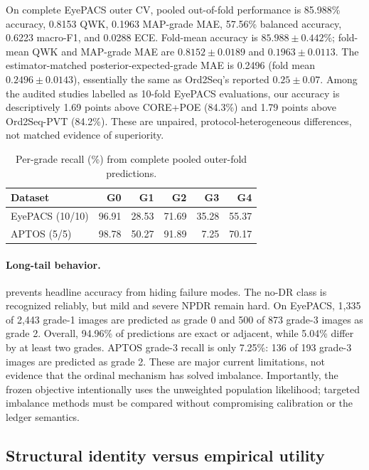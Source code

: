 \documentclass[10pt,twocolumn,letterpaper]{article}
\begin{document}
On complete EyePACS outer CV, pooled out-of-fold performance is 85.988\%
accuracy, 0.8153 QWK, 0.1963 MAP-grade MAE, 57.56\% balanced accuracy,
0.6223 macro-F1, and 0.0288 ECE.  Fold-mean accuracy is
$85.988\!\pm\!0.442$\%; fold-mean QWK and MAP-grade MAE are
$0.8152\!\pm\!0.0189$ and $0.1963\!\pm\!0.0113$.  The estimator-matched
posterior-expected-grade MAE is 0.2496 (fold mean
$0.2496\!\pm\!0.0143$), essentially the same as Ord2Seq's reported
$0.25\!\pm\!0.07$.  Among the audited studies labelled as 10-fold EyePACS
evaluations, our accuracy is descriptively 1.69 points above CORE+POE (84.3\%)
and 1.79 points above Ord2Seq-PVT (84.2\%).  These are unpaired,
protocol-heterogeneous differences, not matched evidence of superiority.

\begin{table}[t]
  \centering
  \caption{Per-grade recall (\%) from complete pooled outer-fold predictions.}
  \label{tab:recall}
  \setlength{\tabcolsep}{4pt}
  \begin{tabular}{@{}lrrrrr@{}}
    \toprule
    Dataset & G0 & G1 & G2 & G3 & G4 \\
    \midrule
    EyePACS (10/10) & 96.91 & 28.53 & 71.69 & 35.28 & 55.37 \\
    APTOS (5/5)    & 98.78 & 50.27 & 91.89 &  7.25 & 70.17 \\
    \bottomrule
  \end{tabular}
\end{table}

\paragraph{Long-tail behavior.}
 prevents headline accuracy from hiding failure modes.
The no-DR class is recognized reliably, but mild and severe NPDR remain hard.
On EyePACS, 1,335 of 2,443 grade-1 images are predicted as grade 0 and 500 of
873 grade-3 images as grade 2.  Overall, 94.96\% of predictions are exact or
adjacent, while 5.04\% differ by at least two grades.  APTOS grade-3 recall is
only 7.25\%: 136 of 193 grade-3 images are predicted as grade 2.  These are
major current limitations, not evidence that the ordinal mechanism has solved
imbalance.  Importantly, the frozen objective intentionally uses the unweighted
population likelihood; targeted imbalance methods must be compared without
compromising calibration or the ledger semantics.

\subsection{Structural identity versus empirical utility}
\end{document}

